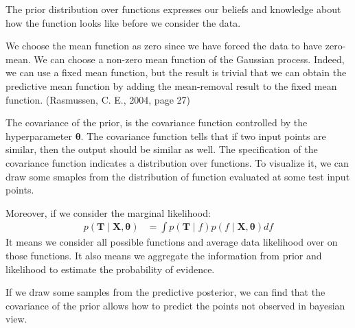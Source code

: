 \documentclass[12pt]{article}
\newenvironment{question}[2][Question]{\begin{trivlist}
\kern10pt
\item[\hskip \labelsep {\bfseries #1}\hskip \labelsep {\bfseries #2.}]}{\end{trivlist}}
\begin{document}
\begin{question}{6}
  The prior distribution over functions expresses our beliefs and knowledge about
how the function looks like before we consider the data.

We choose the mean function as zero
since we have forced the data to have zero-mean. We can choose a non-zero mean
function of the Gaussian process. Indeed, we can use a fixed mean function, but
the result is trivial that we can obtain the predictive mean function by adding 
the mean-removal result to the fixed mean function.
(Rasmussen, C. E., 2004, page 27)

The covariance of the prior, is the covariance
function controlled by the hyperparameter $\bm{\theta}$. The covariance function
tells that if two input points are similar, then the output should be similar as
well. The specification of the covariance function indicates a distribution over 
functions. To visualize it, we can draw some smaples from the distribution of 
function evaluated at some test input points.

Moreover, if we consider the marginal likelihood:
\begin{align*}
  p(\mathbf{T}\mid\mathbf{X}, \bm{\theta}) 
    &= \int p(\mathbf{T}\mid f)p(f\mid \mathbf{X}, \bm{\theta})df
\end{align*}
It means we consider all possible functions and average data likelihood over on those functions.
It also means we aggregate the information from prior and likelihood to estimate the
probability of evidence.

If we draw some samples from the predictive posterior, we can find that the 
covariance of the prior allows how to predict the points not observed in bayesian
view.


\end{question}
\end{document}
